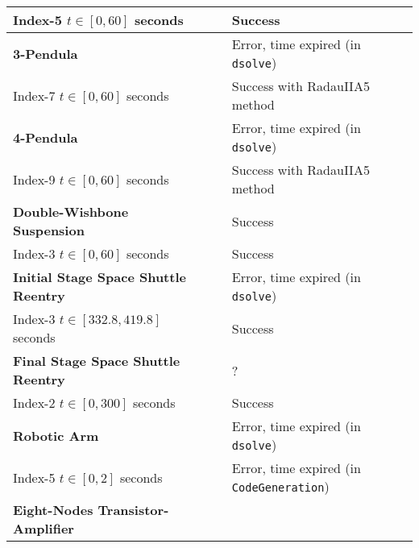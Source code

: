 {\begin{longtable}{lccl}
    Index-5 \quad $t \in [0, 60]$ seconds & \Indigo{} & \mycheckmark{}\phantom{\mywarnmark{}} & Success \\ \midrule
  \multirow{1}{*}{\textbf{3-Pendula~\cite{nedialkov2008solvingIII}}}
    & \Maple{}  & \mycrossmark{}\phantom{\mywarnmark{}} & Error, time expired (in \texttt{dsolve}) \\ \cmidrule(l{4pt}){2-4}
    Index-7 \quad $t \in [0, 60]$ seconds & \Indigo{} & \mycheckmark{}\mywarnmark{} & Success with RadauIIA5 method \\ \midrule
    \multirow{1}{*}{\textbf{4-Pendula~\cite{nedialkov2008solvingIII}}}
      & \Maple{}  & \mycrossmark{}\phantom{\mywarnmark{}} & Error, time expired (in \texttt{dsolve}) \\ \cmidrule(l{4pt}){2-4}
      Index-9 \quad $t \in [0, 60]$ seconds & \Indigo{} & \mycheckmark{}\mywarnmark{} & Success with RadauIIA5 method \\ \midrule
  \multirow{1}{*}{\textbf{Double-Wishbone Suspension}}
    & \Maple{}  & \mycheckmark{}\phantom{\mywarnmark{}} & Success \\ \cmidrule(l{4pt}){2-4}
    Index-3 \quad $t \in [0, 60]$ seconds & \Indigo{} & \mycheckmark{}\phantom{\mywarnmark{}} & Success \\ \midrule
  \multirow{1}{*}{\textbf{Initial Stage Space Shuttle Reentry~\cite{brenan1995numerical}}}
    & \Maple{}  & \mycrossmark{}\phantom{\mywarnmark{}} & Error, time expired (in \texttt{dsolve}) \\ \cmidrule(l{4pt}){2-4}
    Index-3 \quad $t \in [332.8, 419.8]$ seconds & \Indigo{} & \mycheckmark{}\phantom{\mywarnmark{}} & Success \\ \midrule
  \multirow{1}{*}{\textbf{Final Stage Space Shuttle Reentry~\cite{brenan1995numerical}}}
    & \Maple{}  & \mycrossmark{}\phantom{\mywarnmark{}} & ? \\ \cmidrule(l{4pt}){2-4}
    Index-2 \quad $t \in [0, 300]$ seconds & \Indigo{} & \mycheckmark{}\phantom{\mywarnmark{}} & Success \\ \midrule
  \multirow{1}{*}{\textbf{Robotic Arm~\cite{pryce1998solving}}}
    & \Maple{}  & \mycrossmark{}\phantom{\mywarnmark{}} & Error, time expired (in \texttt{dsolve}) \\ \cmidrule(l{4pt}){2-4}
    Index-5 \quad $t \in [0, 2]$ seconds & \Indigo{} & \mycrossmark{}\phantom{\mywarnmark{}} & Error, time expired (in \texttt{CodeGeneration}) \\ \midrule
  \multirow{1}{*}{\textbf{Eight-Nodes Transistor-Amplifier~\cite{lioen1998test, mazzia2008test}}}

\end{longtable}}
